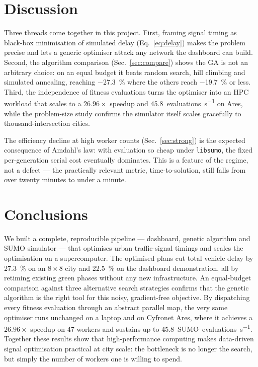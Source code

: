 \documentclass[11pt,a4paper]{article}
\begin{document}
\section{Discussion}
Three threads come together in this project. First, framing signal timing as
black-box minimisation of simulated delay (Eq.~\eqref{eq:delay}) makes the
problem precise and lets a generic optimiser attack any network the dashboard
can build. Second, the algorithm comparison (Sec.~\ref{sec:compare}) shows the
GA is not an arbitrary choice: on an equal budget it beats random search, hill
climbing and simulated annealing, reaching \SI{-27.3}{\percent} where the others
reach \SI{-19.7}{\percent} or less. Third, the independence of fitness
evaluations turns the optimiser into an HPC workload that scales to a
$26.96\times$ speedup and \SI{45.8}{evaluations\per\second} on Ares, while the
problem-size study confirms the simulator itself scales gracefully to
thousand-intersection cities.

The efficiency decline at high worker counts (Sec.~\ref{sec:strong}) is the
expected consequence of Amdahl's law: with evaluation so cheap under
\texttt{libsumo}, the fixed per-generation serial cost eventually dominates.
This is a feature of the regime, not a defect --- the practically relevant
metric, time-to-solution, still falls from over twenty minutes to under a minute.

\section{Conclusions}
We built a complete, reproducible pipeline --- dashboard, genetic algorithm and
SUMO simulator --- that optimises urban traffic-signal timings and scales the
optimisation on a supercomputer. The optimised plans cut total vehicle delay by
\SI{27.3}{\percent} on an $8\times8$ city and \SI{22.5}{\percent} on the
dashboard demonstration, all by retiming existing green phases without any new
infrastructure. An equal-budget comparison against three alternative search
strategies confirms that the genetic algorithm is the right tool for this noisy,
gradient-free objective. By dispatching every fitness evaluation through an
abstract parallel map, the very same optimiser runs unchanged on a laptop and on
Cyfronet Ares, where it achieves a $26.96\times$ speedup on 47 workers and
sustains up to \SI{45.8}{SUMO evaluations\per\second}. Together these results
show that high-performance computing makes data-driven signal optimisation
practical at city scale: the bottleneck is no longer the search, but simply the
number of workers one is willing to spend.
\end{document}
